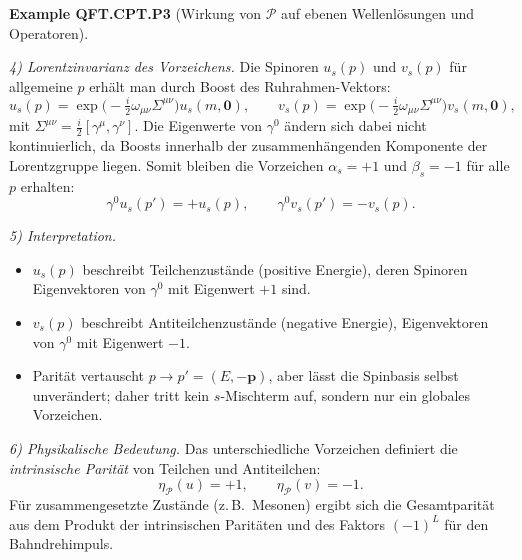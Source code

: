 \documentclass[10pt, letterpaper]{article}
\newcommand{\CustomHeading}[3]{%
  \par\medskip\noindent%
  \textbf{#1 #2} \textnormal{(#3)}.\enskip%
}
\newenvironment{EXA}[2]{\begin{unitbox}\CustomHeading{Example}{#1}{#2}}{\end{unitbox}}
\begin{document}
\begin{EXA}{QFT.CPT.P3}{Wirkung von $\mathcal P$ auf ebenen Wellenlösungen und Operatoren}
\emph{4) Lorentzinvarianz des Vorzeichens.}
Die Spinoren $u_s(p)$ und $v_s(p)$ für allgemeine $p$ erhält man durch Boost des Ruhrahmen-Vektors:
\[
u_s(p)=\exp\!\Big(-\tfrac{i}{2}\omega_{\mu\nu}\Sigma^{\mu\nu}\Big)u_s(m,\mathbf 0),
\qquad
v_s(p)=\exp\!\Big(-\tfrac{i}{2}\omega_{\mu\nu}\Sigma^{\mu\nu}\Big)v_s(m,\mathbf 0),
\]
mit $\Sigma^{\mu\nu}=\frac{i}{2}[\gamma^\mu,\gamma^\nu]$.  
Die Eigenwerte von $\gamma^0$ ändern sich dabei nicht kontinuierlich, da Boosts innerhalb der zusammenhängenden Komponente der Lorentzgruppe liegen.  
Somit bleiben die Vorzeichen $\alpha_s=+1$ und $\beta_s=-1$ für alle $p$ erhalten:
\[
\boxed{\quad
\gamma^0 u_s(p') = +u_s(p),\qquad
\gamma^0 v_s(p') = -v_s(p).
\quad}
\]

\emph{5) Interpretation.}
\begin{itemize}
  \item $u_s(p)$ beschreibt Teilchenzustände (positive Energie), deren Spinoren Eigenvektoren von $\gamma^0$ mit Eigenwert $+1$ sind.
  \item $v_s(p)$ beschreibt Antiteilchenzustände (negative Energie), Eigenvektoren von $\gamma^0$ mit Eigenwert $-1$.
  \item Parität vertauscht $p\to p'=(E,-\mathbf p)$, aber lässt die Spinbasis selbst unverändert; daher tritt kein $s$-Mischterm auf, sondern nur ein globales Vorzeichen.
\end{itemize}

\emph{6) Physikalische Bedeutung.}
Das unterschiedliche Vorzeichen definiert die \emph{intrinsische Parität} von Teilchen und Antiteilchen:
\[
\eta_{\mathcal P}(u)=+1,\qquad
\eta_{\mathcal P}(v)=-1.
\]
Für zusammengesetzte Zustände (z.\,B.\ Mesonen) ergibt sich die Gesamtparität aus dem Produkt der intrinsischen Paritäten und des Faktors $(-1)^L$ für den Bahndrehimpuls.




\end{EXA}
\end{document}
